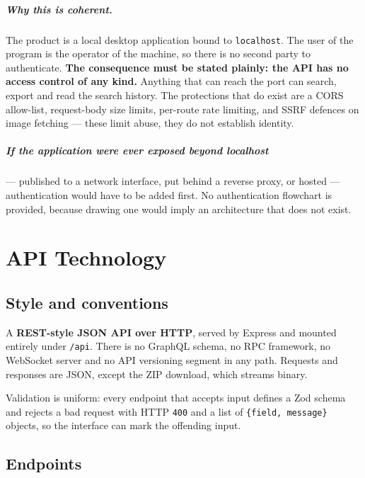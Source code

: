 \documentclass[11pt,a4paper]{report}
\newcommand{\code}[1]{\texttt{\small #1}}
\begin{document}
\paragraph{Why this is coherent.} The product is a local desktop application
bound to \code{localhost}. The user of the program is the operator of the machine,
so there is no second party to authenticate. \textbf{The consequence must be
stated plainly: the API has no access control of any kind.} Anything that can
reach the port can search, export and read the search history. The protections
that do exist are a CORS allow-list, request-body size limits, per-route rate
limiting, and SSRF defences on image fetching --- these limit abuse, they do not
establish identity.

\paragraph{If the application were ever exposed beyond localhost} --- published to
a network interface, put behind a reverse proxy, or hosted --- authentication
would have to be added first. No authentication flowchart is provided, because
drawing one would imply an architecture that does not exist.

\chapter{API Technology}
\label{sec:api}

\section{Style and conventions}

A \textbf{REST-style JSON API over HTTP}, served by Express and mounted entirely
under \code{/api}. There is no GraphQL schema, no RPC framework, no WebSocket
server and no API versioning segment in any path. Requests and responses are
JSON, except the ZIP download, which streams binary.

Validation is uniform: every endpoint that accepts input defines a Zod schema and
rejects a bad request with HTTP \code{400} and a list of
\code{\{field, message\}} objects, so the interface can mark the offending input.

\section{Endpoints}
\end{document}
